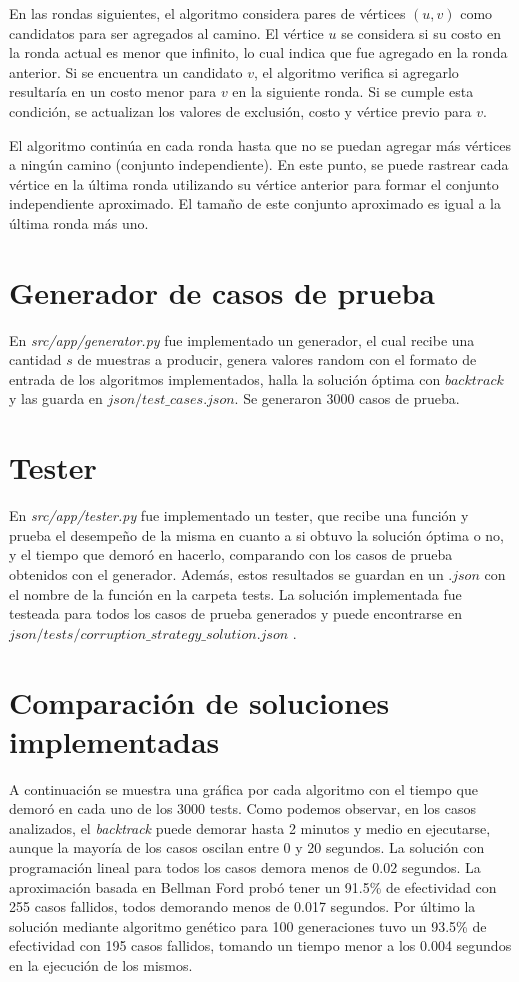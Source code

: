 \documentclass[10pt]{article} %
\begin{document}
	En las rondas siguientes, el algoritmo considera pares de vértices $(u, v)$ como candidatos para ser agregados al camino. El vértice $u$ se considera si su costo en la ronda actual es menor que infinito, lo cual indica que fue agregado en la ronda anterior. Si se encuentra un candidato $v$, el algoritmo verifica si agregarlo resultaría en un costo menor para $v$ en la siguiente ronda. Si se cumple esta condición, se actualizan los valores de exclusión, costo y vértice previo para $v$.
	
	El algoritmo continúa en cada ronda hasta que no se puedan agregar más vértices a ningún camino (conjunto independiente). En este punto, se puede rastrear cada vértice en la última ronda utilizando su vértice anterior para formar el conjunto independiente aproximado. El tamaño de este conjunto aproximado es igual a la última ronda más uno.
	
	\section{Generador de casos de prueba}
	
	En \textit{src/app/generator.py} fue implementado un generador, el cual recibe una cantidad $ s $ de muestras a producir, genera valores random con el formato de entrada de los algoritmos implementados, halla la soluci\'on \'optima con $ backtrack $ y las guarda en $ json/test\_cases.json $. Se generaron 3000 casos de prueba.
	
	\section{Tester}
	En \textit{src/app/tester.py} fue implementado un tester, que recibe una funci\'on y prueba el desempe\~no de la misma en cuanto a si obtuvo la soluci\'on \'optima o no, y el tiempo que demor\'o en hacerlo, comparando con los casos de prueba obtenidos con el generador. Adem\'as, estos resultados se guardan en un $ .json $ con el nombre de la funci\'on en la carpeta tests. La soluci\'on implementada fue testeada para todos los casos de prueba generados y puede encontrarse en $ json/tests/corruption\_strategy\_solution.json $ .
	
	\section{Comparaci\'on de soluciones implementadas}          

    A continuaci\'on se muestra una gr\'afica por cada algoritmo con el tiempo que demor\'o en cada uno de los 3000 tests. Como podemos observar, en los casos analizados, el \textit{backtrack} puede demorar hasta 2 minutos y medio en ejecutarse, aunque la mayor\'ia de los casos oscilan entre 0 y 20 segundos. La soluci\'on con programaci\'on lineal para todos los casos demora menos de 0.02 segundos. La aproximaci\'on basada en Bellman Ford prob\'o tener un 91.5\% de efectividad con 255 casos fallidos, todos demorando menos de 0.017 segundos. Por \'ultimo la soluci\'on mediante algoritmo gen\'etico para 100 generaciones tuvo un 93.5\% de efectividad con 195 casos fallidos, tomando un tiempo menor a los 0.004 segundos en la ejecuci\'on de los mismos. 
   
\end{document}
